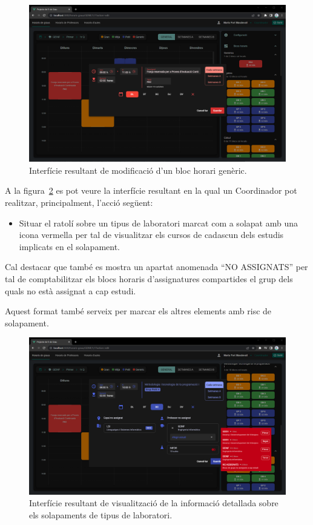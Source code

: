 \documentclass[a4paper,12pt]{ThesisStyle}
\begin{document}
\begin{figure}[H]
  \centering
  \includegraphics[width=\textwidth]{assets/results/horaris/modificacioBlocGeneric.png}
  \caption{\label{img:resultats_horaris_modificacioBlocGeneric}Interfície resultant de modificació d'un bloc horari genèric.}
\end{figure}

\newpage

A la figura~\ref{img:resultats_horaris_modificacioBlocSolapat} es pot veure la interfície resultant en la qual un Coordinador pot realitzar, principalment, l'acció següent:
\begin{itemize}
  \item Situar el ratolí sobre un tipus de laboratori marcat com a solapat amb una icona vermella per tal de visualitzar els cursos de cadascun dels estudis implicats en el solapament.
\end{itemize}

Cal destacar que també es mostra un apartat anomenada ``NO ASSIGNATS'' per tal de comptabilitzar els blocs horaris d'assignatures compartides el grup dels quals no està assignat a cap estudi.

Aquest format també serveix per marcar els altres elements amb risc de solapament.

\begin{figure}[H]
  \centering
  \includegraphics[width=\textwidth]{assets/results/horaris/modificacioBlocSolapat.png}
  \caption{\label{img:resultats_horaris_modificacioBlocSolapat}Interfície resultant de visualització de la informació detallada sobre els solapaments de tipus de laboratori.}
\end{figure}
\end{document}
